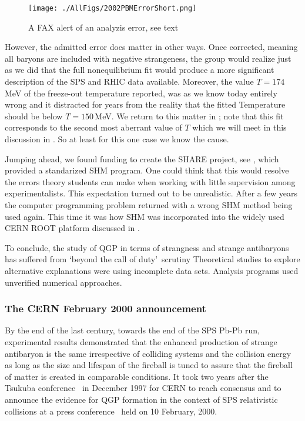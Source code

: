\begin{figure}[tb]
\texttt{[image: ./AllFigs/2002PBMErrorShort.png]}
\caption{
A FAX alert of an analyzis error, see text \label{PBMletter}
}
\end{figure}

However, the admitted error does matter in other ways. Once corrected, meaning all baryons are included with negative strangeness, the group would realize just as we did that the full nonequilibrium fit would produce a more significant description of the SPS and RHIC data available. Moreover, the value $T=174$\,MeV of the freeze-out temperature reported, was as we know today entirely wrong and it distracted for years from the reality that the fitted Temperature should be below $T=150$\,MeV. We return to this matter in ; note that this fit corresponds to the second most aberrant value of $T$ which we will meet in this discussion in . So at least for this one case we know the cause. 

Jumping ahead, we found funding to create the SHARE project, see , which provided a standarized SHM program. One could think that this would resolve the errors theory students can make when working with little supervision among experimentalists. This expectation turned out to be unrealistic. After a few years the computer programming problem returned with a wrong SHM method being used again. This time it was how SHM was incorporated into the widely used CERN ROOT platform discussed in . 

To conclude, the study of QGP in terms of strangness and strange antibaryons has suffered from \lq beyond the call of duty\rq\ scrutiny Theoretical studies to explore alternative explanations were using incomplete data sets. Analysis programs used unverified numerical approaches.
 

\subsubsection{The CERN February 2000 announcement}\label{CERN2000}

By the end of the last century, towards the end of the SPS Pb-Pb run, experimental results demonstrated that the enhanced production of strange antibaryon is the same irrespective of colliding systems and the collision energy as long as the size and lifespan of the fireball is tuned to assure that the fireball of matter is created in comparable conditions. It took two years after the Tsukuba conference~\cite{QM97} in December 1997 for CERN to reach consensus and to announce the evidence for QGP formation in the context of SPS relativistic collisions at a press conference~\cite{CERNPress} held on 10 February, 2000.\\

